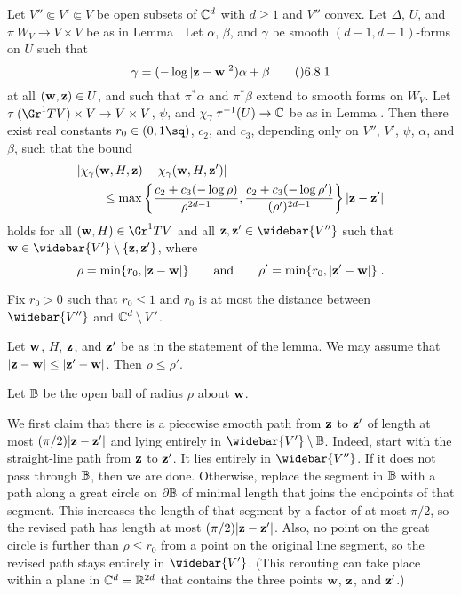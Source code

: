   Let $V''\Subset V'\Subset V$ be open subsets of $\Bbb C^d$
with $d\ge1$ and $V''$ convex.
Let $\Delta$, $U$, and $\pi\:W_V\to V\times V$ be as in Lemma .
Let $\alpha$, $\beta$, and $\gamma$ be smooth $(d-1,d-1)$\snug-forms on $U$
such that
$$\gamma = (-\log|\bold z-\bold w|^2)\alpha + \beta\tag\06.8.1$$
at all $(\bold w,\bold z)\in U$, and such that $\pi^{*}\alpha$
and $\pi^{*}\beta$ extend to smooth forms on $W_V$.
Let $\tau\:(\Gr^1 TV)\times V\to V\times V$, $\psi$,
and $\chi_\gamma\:\tau^{-1}(U)\to\Bbb C$ be as in Lemma .
Then there exist real constants $r_0\in(0,1\sq)$, $c_2$, and $c_3$,
depending only on $V''$, $V'$, $\psi$, $\alpha$, and $\beta$,
such that the bound
$$\split & |\chi_\gamma(\bold w,H,\bold z) - \chi_\gamma(\bold w,H,\bold z')| \\
  &\qquad\le \max\left\{\frac{c_2+c_3(-\log\rho)}{\rho^{2d-1}},
      \frac{c_2+c_3(-\log\rho')}{(\rho')^{2d-1}}\right\}
    |\bold z-\bold z'|\endsplit$$
holds for all $(\bold w,H)\in\Gr^1 TV$ and
all $\bold z,\bold z'\in\widebar{V''}$
such that $\bold w\in\widebar{V'}\setminus\{\bold z,\bold z'\}$, where
$$\rho = \min\{r_0,|\bold z-\bold w|\}
  \qquad\text{and}\qquad \rho' = \min\{r_0,|\bold z'-\bold w|\}\;.$$
\endit

  Fix $r_0>0$ such that $r_0\le1$ and $r_0$ is at most
the distance between $\widebar{V''}$ and $\Bbb C^d\setminus V'$.

Let $\bold w$, $H$, $\bold z$, and $\bold z'$ be as in the statement
of the lemma.  We may assume that $|\bold z-\bold w|\le|\bold z'-\bold w|$.
Then $\rho\le \rho'$.

Let $\Bbb B$ be the open ball of radius $\rho$ about $\bold w$.

We first claim that there is a piecewise smooth path
from $\bold z$ to $\bold z'$ of length at most $(\pi/2)|\bold z-\bold z'|$
and lying entirely in $\widebar{V'}\setminus\Bbb B$.
Indeed, start with the straight-line path from $\bold z$ to $\bold z'$.
It lies entirely in $\widebar{V''}$.  If it does not pass through $\Bbb B$,
then we are done.  Otherwise, replace the segment in $\Bbb B$ with a path
along a great circle on $\partial\Bbb B$ of minimal length that
joins the endpoints of that segment.  This increases the length of that segment
by a factor of at most $\pi/2$, so the revised path has length at most
$(\pi/2)|\bold z-\bold z'|$.  Also, no point on the great circle is further
than $\rho\le r_0$ from a point on the original line segment, so
the revised path stays entirely in $\widebar{V'}$.  (This rerouting can take
place within a plane in $\Bbb C^d=\Bbb R^{2d}$ that contains the three points
$\bold w$, $\bold z$, and $\bold z'$.)

